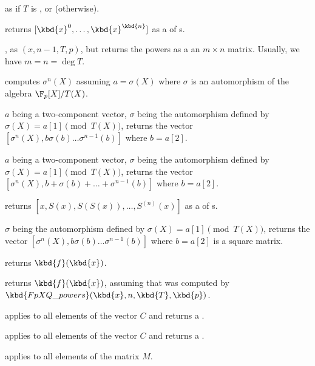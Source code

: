  as
 if $T$ is ,
or  (otherwise).


 returns $[\kbd{x}^0,
\dots, \kbd{x}^\kbd{n}]$ as a  of s.

, as
$(x, n-1, T, p)$, but returns the powers as a an
$m\times n$ matrix. Usually, we have $m = n = \deg T$.

 computes $\sigma^n(X)$
assuming $a=\sigma(X)$ where $\sigma$ is an automorphism of the algebra
$\F_p[X]/T(X)$.

$a$ being a two-component vector,
$\sigma$ being the automorphism defined by $\sigma(X)=a[1]\pmod{T(X)}$,
returns the vector $[\sigma^n(X),b\sigma(b)\ldots\sigma^{n-1}(b)]$
where $b=a[2]$.

$a$ being a two-component vector,
$\sigma$ being the automorphism defined by $\sigma(X)=a[1]\pmod{T(X)}$,
returns the vector $[\sigma^n(X),b+\sigma(b)+\ldots+\sigma^{n-1}(b)]$
where $b=a[2]$.

 returns
$[x,S(x),S(S(x)),\dots,S^{(n)}(x)]$ as a  of s.

$\sigma$ being the automorphism defined by $\sigma(X)=a[1]\pmod{T(X)}$,
returns the vector $[\sigma^n(X),b\sigma(b)\ldots\sigma^{n-1}(b)]$
where $b=a[2]$ is a square matrix.

 returns
$\kbd{f}(\kbd{x})$.

 returns
$\kbd{f}(\kbd{x})$, assuming that  was computed by
$\kbd{FpXQ\_powers}(\kbd{x}, n, \kbd{T}, \kbd{p})$.

 applies
 to all elements of the vector $C$
and returns a .

 applies
 to all elements of the vector $C$
and returns a .

 applies
 to all elements of the matrix $M$.

